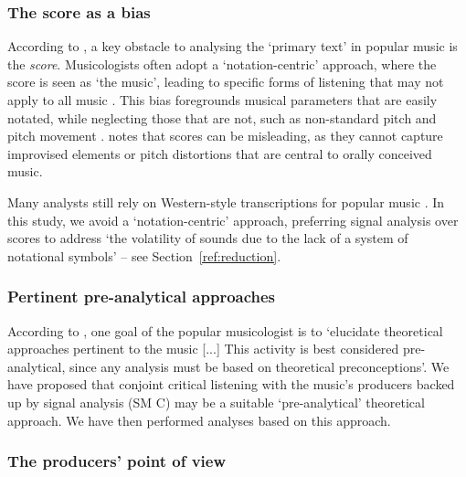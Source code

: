 \documentclass{article}
\begin{document}


\subsubsection{The score as a bias}\label{ref:scoreasbias}

According to \citeauthor{middleton1990studying}, a key obstacle to analysing the `primary text' in popular music is the \emph{score}. Musicologists often adopt a `notation-centric' approach, where the score is seen as `the music', leading to specific forms of listening that may not apply to all music \citep[p.~105]{middleton1990studying}. This bias foregrounds musical parameters that are easily notated, while neglecting those that are not, such as non-standard pitch and pitch movement \citep[pp.~104--105]{middleton1990studying}. \citet[p.~16]{mellers1974twilight} notes that scores can be misleading, as they cannot capture improvised elements or pitch distortions that are central to orally conceived music.

Many analysts still rely on Western-style transcriptions for popular music \citep{tagg1982analysing,everett1986fantastic,middleton1990studying,moore2016song,moore2018rock}. In this study, we avoid a `notation-centric' approach, preferring signal analysis over scores to address `the volatility of sounds due to the lack of a system of notational symbols' \citep[p.~103]{aluas1996quatour} -- see Section~\ref{ref:reduction}.


\subsubsection{Pertinent pre-analytical approaches}

According to \citet[p.~10]{moore2018rock}, one goal of the popular musicologist is to `elucidate theoretical approaches pertinent to the music [...] This activity is best considered pre-analytical, since any analysis must be based on theoretical preconceptions'. We have proposed that conjoint critical listening with the music's producers backed up by signal analysis (SM C) may be a suitable `pre-analytical' theoretical approach. We have then performed analyses based on this approach.



\subsubsection{The producers' point of view}
\end{document}
